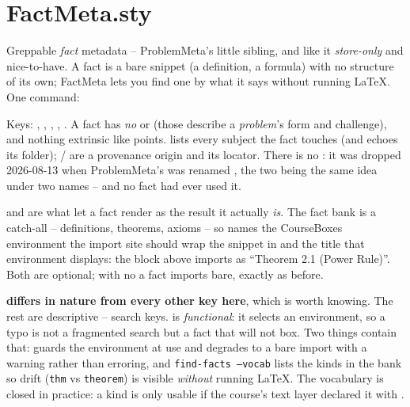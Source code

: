 \section{FactMeta.sty}\label{sec:ref-factmeta}

Greppable \emph{fact} metadata -- ProblemMeta's little sibling, and like it
\emph{store-only} and nice-to-have. A fact is a bare snippet (a definition, a
formula) with no structure of its own; FactMeta lets you find one by what it
says without running \LaTeX. One command:

\begin{manexsource}
\end{manexsource}

Keys: , , , , .
A fact has \emph{no}  or  (those
describe a \emph{problem}'s form and challenge), and nothing extrinsic like
points.  lists every subject the fact touches (and echoes its
folder); / are a provenance origin and its locator.
There is no : it was dropped 2026-08-13 when ProblemMeta's
 was renamed , the two being the same idea under two
names -- and no fact had ever used it.

 and  are what let a fact render as the result it
actually \emph{is}. The fact bank is a catch-all -- definitions, theorems,
axioms -- so  names the CourseBoxes environment the import site
should wrap the snippet in and  the title that environment
displays: the block above imports as ``Theorem 2.1 (Power Rule)''. Both are
optional; with no  a fact imports bare, exactly as before.

\textbf{ differs in nature from every other key here}, which is
worth knowing. The rest are descriptive -- search keys.  is
\emph{functional}: it selects an environment, so a typo is not a fragmented
search but a fact that will not box. Two things contain that:
 guards the environment at use and degrades to a bare import
with a warning rather than erroring, and \texttt{find-facts --vocab} lists
the kinds in the bank so drift (\texttt{thm} vs \texttt{theorem}) is visible
\emph{without} running \LaTeX. The vocabulary is closed in practice: a kind
is only usable if the course's text layer declared it with
.

